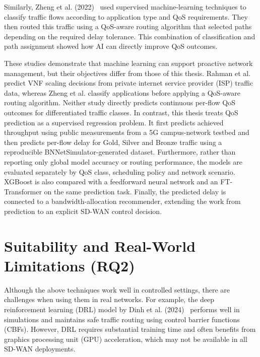 \documentclass[a4paper,12pt]{Classes/RoboticsLaTeX}
\begin{document}
Similarly, Zheng et al. (2022)~\cite{zheng2022applicationaware} used supervised machine-learning techniques to classify traffic flows according to application type and QoS requirements. They then routed this traffic using a QoS-aware routing algorithm that selected paths depending on the required delay tolerance. This combination of classification and path assignment showed how AI can directly improve QoS outcomes.

These studies demonstrate that machine learning can support proactive network management, but their objectives differ from those of this thesis. Rahman et al. predict VNF scaling decisions from private internet service provider (ISP) traffic data, whereas Zheng et al. classify applications before applying a QoS-aware routing algorithm. Neither study directly predicts continuous per-flow QoS outcomes for differentiated traffic classes. In contrast, this thesis treats QoS prediction as a supervised regression problem. It first predicts achieved throughput using public measurements from a 5G campus-network testbed and then predicts per-flow delay for Gold, Silver and Bronze traffic using a reproducible BNNetSimulator-generated dataset. Furthermore, rather than reporting only global model accuracy or routing performance, the models are evaluated separately by QoS class, scheduling policy and network scenario. XGBoost is also compared with a feedforward neural network and an FT-Transformer on the same prediction task. Finally, the predicted delay is connected to a bandwidth-allocation recommender, extending the work from prediction to an explicit SD-WAN control decision.

\section{Suitability and Real-World Limitations (RQ2)}

Although the above techniques work well in controlled settings, there are challenges when using them in real networks. For example, the deep reinforcement learning (DRL) model by Dinh et al. (2024)~\cite{dinh2024safeloadbalancing} performs well in simulations and maintains safe traffic routing using control barrier functions (CBFs). However, DRL requires substantial training time and often benefits from graphics processing unit (GPU) acceleration, which may not be available in all SD-WAN deployments.
\end{document}
